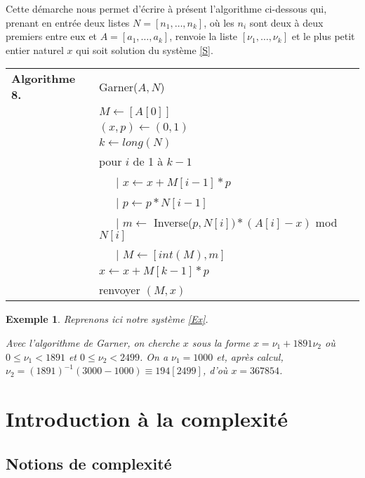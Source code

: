 \documentclass[12pt]{report}
\newtheorem*{ex}{Exemple}
\begin{document}
Cette démarche nous permet d'écrire à présent l'algorithme ci-dessous qui, prenant en entrée deux listes $N=[n_1, \ldots , n_k]$, où les $n_i$ sont deux à deux premiers entre eux et $A=[a_1,\ldots, a_k]$, renvoie la liste  $[\nu_1, \ldots, \nu_k ]$ et le plus petit entier naturel $x$ qui soit solution du système \eqref{S}.\\

\begin{tabular}{ll}
\textbf{Algorithme 8.} & Garner($A,N$)\\
           & $M \leftarrow  [A[0]]$ \\
           & $(x,p)\leftarrow (0,1) $ \\
           & $ k \leftarrow long(N) $    \\
           & pour $i$ de 1 à $k-1$ \\
           & \ \ \ {\rm | } $ x \leftarrow x+M[i-1]*p $  \\
           & \ \ \ {\rm | } $p \leftarrow p*N[i-1] $ \\
           & \ \ \ {\rm | } $ m \leftarrow $ Inverse($p,N[i])*(A[i]-x) $ mod $N[i]$\\ 
           & \ \ \ {\rm | } $M \leftarrow  [int(M),m ] $  \\
           & $x \leftarrow x + M[k-1]*p$ \\    
           &  renvoyer $(M,x)$ 
\end{tabular}

\begin{ex}
Reprenons ici notre système \eqref{Ex}. \par 
Avec l'algorithme de Garner, on cherche $x$ sous la forme $x=\nu_1 +1891 \nu_2 $ où $0 \leq \nu_1 < 1891$ et $0 \leq \nu_2 < 2499$. On a $\nu_1=1000$ et, après calcul, $\nu_2=(1891)^{-1}(3000-1000)\equiv 194 [2499]$, d'où $x=367854$.
\end{ex}





\chapter{Introduction à la complexité}
\section{Notions de complexité}
\end{document}

